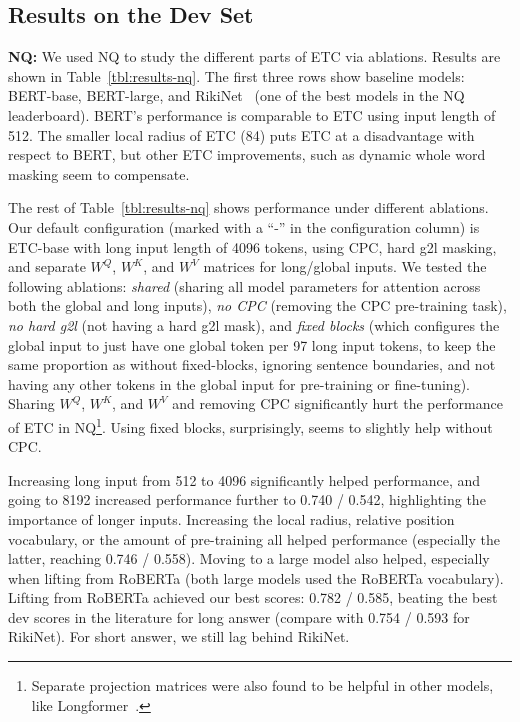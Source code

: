 \documentclass[11pt,a4paper]{article}
\begin{document}
\subsection{Results on the Dev Set}

{\bf NQ:} We used NQ to study the different parts of ETC via ablations. Results are shown in Table~\ref{tbl:results-nq}. The first three rows show baseline models: BERT-base, BERT-large, and RikiNet~\cite{liu2020rikinet} (one of the best models in the NQ leaderboard). 
BERT's performance is comparable to ETC using input length of 512. The smaller local radius of ETC (84) puts ETC at a disadvantage with respect to BERT, but other ETC improvements, such as dynamic whole word masking seem to compensate. 

The rest of Table~\ref{tbl:results-nq} shows performance under different ablations. Our default configuration (marked with a ``-'' in the configuration column) is ETC-base with long input length of 4096 tokens, using CPC, hard g2l masking, and separate $W^Q$, $W^K$, and $W^V$ matrices for long/global inputs. We tested the following ablations: {\em shared} (sharing all model parameters for attention across both the global and long inputs), {\em no CPC} (removing the CPC pre-training task), {\em no hard g2l} (not having a hard g2l mask), and {\em fixed blocks} (which configures the global input to just have one global token per 97 long input tokens, to keep the same proportion as without fixed-blocks, ignoring sentence boundaries, and not having any other tokens in the global input for pre-training or fine-tuning). 
Sharing $W^Q$, $W^K$, and $W^V$ and removing CPC significantly hurt the performance of ETC in NQ\footnote{Separate projection matrices were also found to be helpful in other models, like Longformer~\cite{beltagy2020longformer}.}. Using fixed blocks, surprisingly, seems to slightly help without CPC.

Increasing long input from 512 to 4096 significantly helped performance, and going to 8192 increased performance further to 0.740 / 0.542, highlighting the importance of longer inputs. Increasing the local radius, relative position vocabulary, or the amount of pre-training all helped performance (especially the latter, reaching 0.746 / 0.558). 
Moving to a large model also helped, especially when lifting from RoBERTa (both large models used the RoBERTa vocabulary). Lifting from RoBERTa achieved our best scores: 0.782 / 0.585, beating the best dev scores in the literature for long answer (compare with 0.754 / 0.593 for RikiNet). For short answer, we still lag behind RikiNet.
\end{document}
